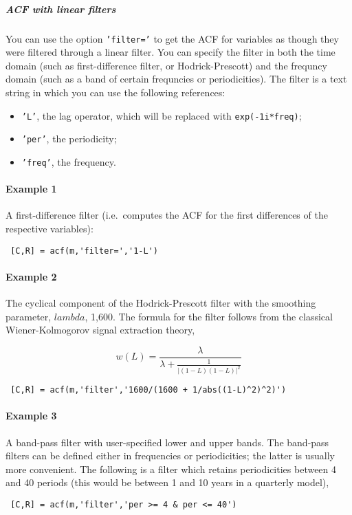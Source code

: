  \subparagraph{ACF with linear filters}
 
 You can use the option \texttt{'filter='} to get the ACF for variables
 as though they were filtered through a linear filter. You can specify
 the filter in both the time domain (such as first-difference filter, or
 Hodrick-Prescott) and the frequncy domain (such as a band of certain
 frequncies or periodicities). The filter is a text string in which you
 can use the following references:
 
 \begin{itemize}
 \item
   \texttt{'L'}, the lag operator, which will be replaced with
   \texttt{exp(-1i*freq)};
 \item
   \texttt{'per'}, the periodicity;
 \item
   \texttt{'freq'}, the frequency.
 \end{itemize}
 
 \paragraph{Example 1}
 
 A first-difference filter (i.e.~computes the ACF for the first
 differences of the respective variables):
 
 \begin{verbatim}
 [C,R] = acf(m,'filter=','1-L')
 \end{verbatim}
 
 \paragraph{Example 2}
 
 The cyclical component of the Hodrick-Prescott filter with the smoothing
 parameter, $lambda$, 1,600. The formula for the filter follows from the
 classical Wiener-Kolmogorov signal extraction theory,
 
 \[w(L) = \frac{\lambda}{\lambda + \frac{1}{ | (1-L)(1-L) | ^2}}\]
 
 \begin{verbatim}
 [C,R] = acf(m,'filter','1600/(1600 + 1/abs((1-L)^2)^2)')
 \end{verbatim}
 
 \paragraph{Example 3}
 
 A band-pass filter with user-specified lower and upper bands. The
 band-pass filters can be defined either in frequencies or periodicities;
 the latter is usually more convenient. The following is a filter which
 retains periodicities between 4 and 40 periods (this would be between 1
 and 10 years in a quarterly model),
 
 \begin{verbatim}
 [C,R] = acf(m,'filter','per >= 4 & per <= 40')
 \end{verbatim}



